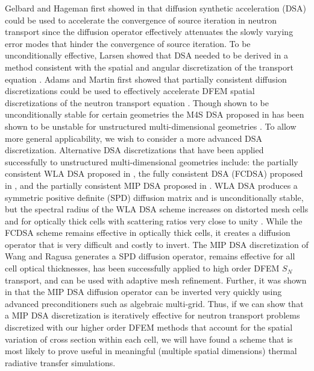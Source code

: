 Gelbard and Hageman first showed in \cite{old_dsa} that diffusion synthetic acceleration (DSA) could be used to accelerate the convergence of source iteration in neutron transport since the diffusion operator effectively attenuates the slowly varying error modes that hinder the convergence of source iteration.
To be unconditionally effective, Larsen showed that DSA needed to be derived in a method consistent with the spatial and angular discretization of the transport equation \cite{larsen_dsa}.
Adams and Martin first showed that partially consistent diffusion discretizations could be used to effectively accelerate DFEM spatial discretizations of the neutron transport equation \cite{adams_dsa}.
Though shown to be unconditionally stable for certain geometries the M4S DSA proposed in \cite{adams_dsa} has been shown to be unstable for unstructured multi-dimensional geometries \cite{wwm_dsa}.
To allow more general applicability, we wish to consider a more advanced DSA discretization.
Alternative DSA discretizations that have been applied successfully to unstructured multi-dimensional geometries include: the partially consistent WLA DSA proposed in \cite{wla_dsa}, the fully consistent DSA (FCDSA) proposed in \cite{wwm_dsa}, and the partially consistent MIP DSA proposed in \cite{mip_dsa}.
WLA DSA produces a symmetric positive definite (SPD) diffusion matrix and is unconditionally stable, but the spectral radius of the WLA DSA scheme increases on distorted mesh cells and for optically thick cells with scattering ratios very close to unity \cite{wla_dsa,wwm_dsa}.
While the FCDSA scheme remains effective in optically thick cells, it creates a diffusion operator that is very difficult and costly to invert\cite{wwm_dsa}. 
The MIP DSA discretization \cite{mip_dsa} of Wang and Ragusa generates a SPD diffusion operator, remains effective for all cell optical thicknesses, has been successfully applied to high order DFEM $S_N$ transport, and can be used with adaptive mesh refinement.
Further, it was shown in \cite{mip_mc} that the MIP DSA diffusion operator can be inverted very quickly using advanced preconditioners such as algebraic multi-grid.
Thus, if we can show that a MIP DSA discretization is iteratively effective for neutron transport problems discretized with our higher order DFEM methods that account for the spatial variation of cross section within each cell, we will have found a scheme that is most likely to prove useful in meaningful (multiple spatial dimensions) thermal radiative transfer simulations.


